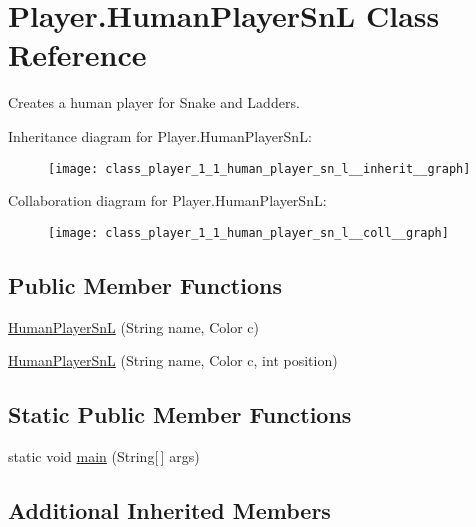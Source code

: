 \hypertarget{class_player_1_1_human_player_sn_l}{}\section{Player.\+Human\+Player\+Sn\+L Class Reference}
\label{class_player_1_1_human_player_sn_l}


Creates a human player for Snake and Ladders.  




Inheritance diagram for Player.\+Human\+Player\+Sn\+L\+:\nopagebreak
\begin{figure}[H]
\begin{center}
\leavevmode
\texttt{[image: class\_player\_1\_1\_human\_player\_sn\_l\_\_inherit\_\_graph]}
\end{center}
\end{figure}


Collaboration diagram for Player.\+Human\+Player\+Sn\+L\+:\nopagebreak
\begin{figure}[H]
\begin{center}
\leavevmode
\texttt{[image: class\_player\_1\_1\_human\_player\_sn\_l\_\_coll\_\_graph]}
\end{center}
\end{figure}
\subsection*{Public Member Functions}
\begin{DoxyCompactItemize}
\item 
\hyperlink{class_player_1_1_human_player_sn_l_a7605b134f337342fedb834ec55a03b7a}{Human\+Player\+Sn\+L} (String name, Color c)
\item 
\hyperlink{class_player_1_1_human_player_sn_l_ab22f9ceaee8c00bd22b6372d54452391}{Human\+Player\+Sn\+L} (String name, Color c, int position)
\end{DoxyCompactItemize}
\subsection*{Static Public Member Functions}
\begin{DoxyCompactItemize}
\item 
static void \hyperlink{class_player_1_1_human_player_sn_l_a74ccdaec9a1d4188bd8c6c79b2c7f712}{main} (String\mbox{[}$\,$\mbox{]} args)
\end{DoxyCompactItemize}
\subsection*{Additional Inherited Members}


